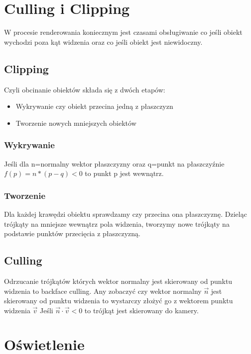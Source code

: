 \documentclass{../notatki}
\begin{document}
\section{Culling i Clipping}

W procesie renderowania koniecznym jest czasami obsługiwanie co jeśli
obiekt wychodzi poza kąt widzenia oraz co jeśli obiekt jest niewidoczny.

\subsection{Clipping}

Czyli obcinanie obiektów składa się z dwóch etapów:

\begin{itemize}
  \item Wykrywanie czy obiekt przecina jedną z płaszczyzn
  \item Tworzenie nowych mniejszych obiektów
\end{itemize}

\subsubsection{Wykrywanie}

Jeśli dla n=normalny wektor płaszczyzny oraz q=punkt na płaszczyźnie
$f(p) = n * (p - q) < 0$ to punkt p jest wewnątrz.

\subsubsection{Tworzenie}

Dla każdej krawędzi obiektu sprawdzamy czy przecina ona płaszczyznę.
Dzieląc trójkąty na mniejsze wewnątrz pola widzenia, tworzymy nowe
trójkąty na podstawie punktów przecięcia z płaszczyzną.

\subsection{Culling}

Odrzucanie trójkątów których wektor normalny jest skierowany od
punktu widzenia to backface culling.
Any zobaczyć czy wektor normalny $\vec{n}$ jest skierowany od punktu
widzenia to wystarczy złożyć go z wektorem punktu widzenia $\vec{v}$
Jeśli $\vec{n} \cdot \vec{v} < 0$ to trójkąt jest skierowany do kamery.

\section{Oświetlenie}
\end{document}
